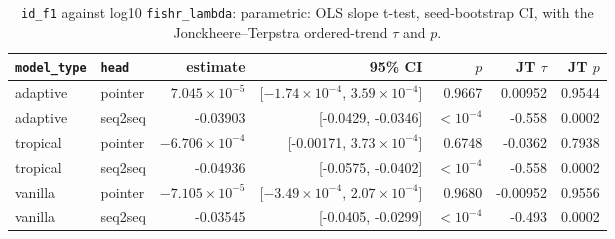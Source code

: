 \documentclass[10pt]{article}
\begin{document}
{\small
\begin{longtable}{llrrrrr}
\caption{\texttt{id\_f1} against log10 \texttt{fishr\_lambda}: parametric: OLS slope t-test, seed-bootstrap CI, with the Jonckheere--Terpstra ordered-trend $\tau$ and $p$.}\label{tab:trend-id_f1}\\
\toprule
\texttt{model\_type} & \texttt{head} & estimate & 95\% CI & $p$ & JT $\tau$ & JT $p$\\
\midrule
\endhead
adaptive & pointer & $7.045\times10^{-5}$ & [$-1.74\times10^{-4}$, $3.59\times10^{-4}$] & 0.9667 & 0.00952 & 0.9544\\
adaptive & seq2seq & -0.03903 & [-0.0429, -0.0346] & $<10^{-4}$ & -0.558 & 0.0002\\
tropical & pointer & $-6.706\times10^{-4}$ & [-0.00171, $3.73\times10^{-4}$] & 0.6748 & -0.0362 & 0.7938\\
tropical & seq2seq & -0.04936 & [-0.0575, -0.0402] & $<10^{-4}$ & -0.558 & 0.0002\\
vanilla & pointer & $-7.105\times10^{-5}$ & [$-3.49\times10^{-4}$, $2.07\times10^{-4}$] & 0.9680 & -0.00952 & 0.9556\\
vanilla & seq2seq & -0.03545 & [-0.0405, -0.0299] & $<10^{-4}$ & -0.493 & 0.0002\\
\bottomrule
\end{longtable}
}
\end{document}
